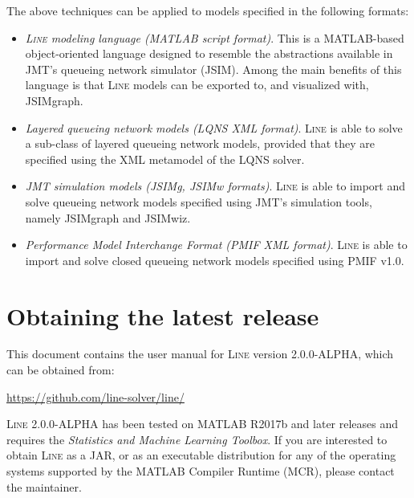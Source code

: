 The above techniques can be applied to models specified in the following formats:
\begin{itemize}
\item {\em \textsc{Line} modeling language (MATLAB script format)}. This is a MATLAB-based object-oriented language designed to resemble the abstractions available in JMT's queueing network simulator (JSIM). Among the main benefits of this language is that \textsc{Line} models can be exported to, and visualized with, JSIMgraph.
\item {\em Layered queueing network models (LQNS XML format)}. \textsc{Line} is able to solve a sub-class of layered queueing network models, provided that they are specified using the XML metamodel of the LQNS solver. %
\item {\em JMT simulation models (JSIMg, JSIMw formats)}. \textsc{Line} is able to import and solve queueing network models specified using JMT's simulation tools, namely JSIMgraph and JSIMwiz.
\item {\em Performance Model Interchange Format (PMIF XML format)}. \textsc{Line} is able to import and solve closed queueing network models specified using PMIF v1.0.
\end{itemize}

\section{Obtaining the latest release}
\label{obtaining-the-latest-release}
This document contains the user manual for \textsc{Line} version 2.0.0-ALPHA, which can be obtained from:
\begin{center}
{\url{https://github.com/line-solver/line/}}
\end{center}
\noindent \textsc{Line} 2.0.0-ALPHA has been tested on MATLAB R2017b and later releases and requires the \emph{Statistics and Machine Learning Toolbox}. If you are interested to obtain \textsc{Line} as a JAR, or as an executable distribution for any of the operating systems supported by the MATLAB Compiler Runtime (MCR), please contact the maintainer.

